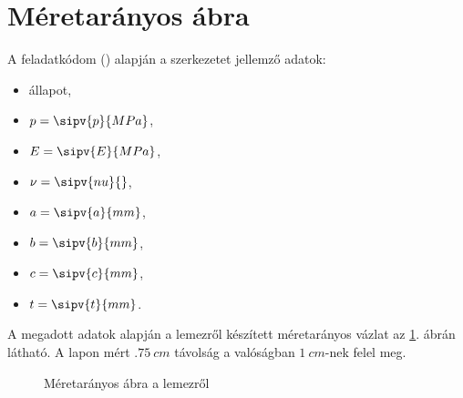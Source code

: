 \section{Méretarányos ábra}

A feladatkódom (\texttt{})
alapján a szerkezetet jellemző adatok:
\begin{myframe}
  \vspace{-.66em}
  \begin{multicols}{2}
    \begin{itemize}
      \item {} állapot,
      \item $p = \sipv{p}{MPa}$,
      \item $E = \sipv{E}{MPa}$,
      \item $\nu = \sipv{nu}{}$,

      \item $a = \sipv{a}{mm}$,
      \item $b = \sipv{b}{mm}$,
      \item $c = \sipv{c}{mm}$,
      \item $t = \sipv{t}{mm}$.
    \end{itemize}
  \end{multicols}
\end{myframe}

A megadott adatok alapján a lemezről készített méretarányos vázlat az
\ref{fig:construction}. ábrán látható. A lapon mért $\SI{.75}{cm}$ távolság
a valóságban $\SI{1}{cm}$-nek felel meg.

\begin{figure}[H]
  \centering
  
  \vspace{-2mm}
  \caption{Méretarányos ábra a lemezről}
  \vspace{-5mm}
  \label{fig:construction}
\end{figure}
